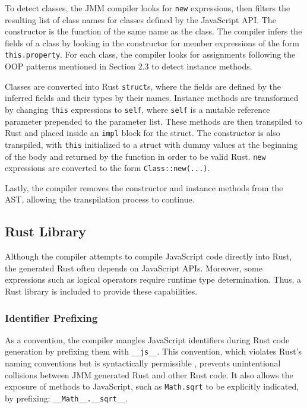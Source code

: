 \documentclass[12pt]{article}
\begin{document}
	To detect classes, the JMM compiler looks for \texttt{new} expressions, then filters the resulting list of class names for classes defined by the JavaScript API. The constructor is the function of the same name as the class. The compiler infers the fields of a class by looking in the constructor for member expressions of the form \texttt{this.property}. For each class, the compiler looks for assignments following the OOP patterns mentioned in Section 2.3 to detect instance methods.
	
	Classes are converted into Rust \texttt{struct}s, where the fields are defined by the inferred fields and their types by their names. Instance methods are transformed by changing \texttt{this} expressions to \texttt{self}, where \texttt{self} is a mutable reference parameter prepended to the parameter list. These methods are then transpiled to Rust and placed inside an \texttt{impl} block for the struct. The constructor is also transpiled, with \texttt{this} initialized to a struct with dummy values at the beginning of the body and returned by the function in order to be valid Rust. \texttt{new} expressions are converted to the form \texttt{Class::new(...)}.
	
	Lastly, the compiler removes the constructor and instance methods from the AST, allowing the transpilation process to continue.
	
	\subsection{Rust Library}
	
	Although the compiler attempts to compile JavaScript code directly into Rust, the generated Rust often depends on JavaScript APIs. Moreover, some expressions such as logical operators require runtime type determination. Thus, a Rust library is included to provide these capabilities.
	
	\subsubsection{Identifier Prefixing}
	
	As a convention, the compiler mangles JavaScript identifiers during Rust code generation by prefixing them with \texttt{\_\_js\_\_}. This convention, which violates Rust's naming conventions but is syntactically permissible \cite{rustref}, prevents unintentional collisions between JMM generated Rust and other Rust code. It also allows the exposure of methods to JavaScript, such as \texttt{Math.sqrt} to be explicitly indicated, by prefixing: \texttt{\_\_Math\_\_.\_\_sqrt\_\_}.
	
\end{document}
